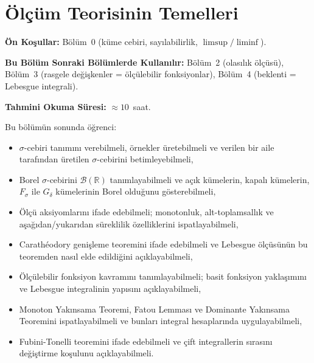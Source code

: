 
\chapter{Ölçüm Teorisinin Temelleri}


\noindent\textbf{Ön Koşullar:} Bölüm~0 (küme cebiri, sayılabilirlik, $\limsup/\liminf$).

\noindent\textbf{Bu Bölüm Sonraki Bölümlerde Kullanılır:}
Bölüm~2 (olasılık ölçüsü),
Bölüm~3 (rasgele değişkenler = ölçülebilir fonksiyonlar),
Bölüm~4 (beklenti = Lebesgue integrali).

\noindent\textbf{Tahmini Okuma Süresi:} $\approx 10$~saat.

\vspace{0.5\baselineskip}

\begin{kazanimlar}
Bu bölümün sonunda öğrenci:
\begin{itemize}
  \item $\sigma$-cebiri tanımını verebilmeli, örnekler üretebilmeli ve
        verilen bir aile tarafından üretilen $\sigma$-cebirini betimleyebilmeli,
  \item Borel $\sigma$-cebirini $\mathcal{B}(\mathbb{R})$ tanımlayabilmeli ve
        açık kümelerin, kapalı kümelerin, $F_\sigma$ ile $G_\delta$ kümelerinin
        Borel olduğunu gösterebilmeli,
  \item Ölçü aksiyomlarını ifade edebilmeli; monotonluk, alt-toplamsallık ve
        aşağıdan/yukarıdan süreklilik özelliklerini ispatlayabilmeli,
  \item Carathéodory genişleme teoremini ifade edebilmeli ve Lebesgue ölçüsünün
        bu teoremden nasıl elde edildiğini açıklayabilmeli,
  \item Ölçülebilir fonksiyon kavramını tanımlayabilmeli; basit fonksiyon
        yaklaşımını ve Lebesgue integralinin yapısını açıklayabilmeli,
  \item Monoton Yakınsama Teoremi, Fatou Lemması ve Dominante Yakınsama
        Teoremini ispatlayabilmeli ve bunları integral hesaplarında uygulayabilmeli,
  \item Fubini-Tonelli teoremini ifade edebilmeli ve çift integrallerin sırasını
        değiştirme koşulunu açıklayabilmeli.
\end{itemize}
\end{kazanimlar}

